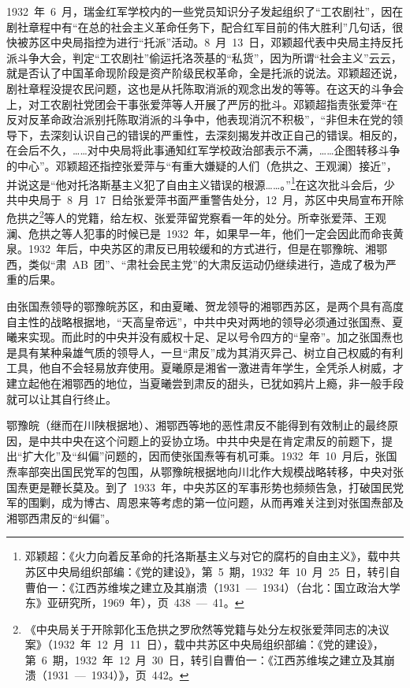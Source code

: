 1932~年~6~月，瑞金红军学校内的一些党员知识分子发起组织了“工农剧社”，因在剧社章程中有“在总的社会主义革命任务下，配合红军目前的伟大胜利”几句话，很快被苏区中央局指控为进行“托派”活动。8~月~13~日，邓颖超代表中央局主持反托派斗争大会，判定“工农剧社”偷运托洛茨基的“私货”，因为所谓“社会主义”云云，就是否认了中国革命现阶段是资产阶级民权革命，全是托派的说法。邓颖超还说，剧社章程没提农民问题，这也是从托陈取消派的观念出发的等等。在这天的斗争会上，对工农剧社党团会干事张爱萍等人开展了严厉的批斗。邓颖超指责张爱萍“在反对反革命政治派别托陈取消派的斗争中，他表现消沉不积极”，“非但未在党的领导下，去深刻认识自己的错误的严重性，去深刻揭发并改正自己的错误。相反的，在会后不久，……对中央局将此事通知红军学校政治部表示不满，……企图转移斗争的中心”。邓颖超还指控张爱萍与“有重大嫌疑的人们（危拱之、王观澜）接近”，并说这是“他对托洛斯基主义犯了自由主义错误的根源……。”\footnote{邓颖超：《火力向着反革命的托洛斯基主义与对它的腐朽的自由主义》，载中共苏区中央局组织部编：《党的建设》，第~5~期，1932~年~10~月~25~日，转引自曹伯一：《江西苏维埃之建立及其崩溃（1931~—~1934）（台北：国立政治大学东》亚研究所，1969~年），页~438~—~41。}在这次批斗会后，少共中央局于~8~月~17~日给张爱萍书面严重警告处分，12~月，苏区中央局宣布开除危拱之\footnote{《中央局关于开除郭化玉危拱之罗欣然等党籍与处分左权张爱萍同志的决议案》（1932~年~12~月~11~日），载中共苏区中央局组织部编：《党的建设》，第~6~期，1932~年~12~月~30~日，转引自曹伯一：《江西苏维埃之建立及其崩溃（1931~—~1934）》，页~442。}等人的党籍，给左权、张爱萍留党察看一年的处分。所幸张爱萍、王观澜、危拱之等人犯事的时候已是~1932~年，如果早一年，他们一定会因此而命丧黄泉。1932~年后，中央苏区的肃反已用较缓和的方式进行，但是在鄂豫皖、湘鄂西，类似“肃~AB~团”、“肃社会民主党”的大肃反运动仍继续进行，造成了极为严重的后果。

由张国焘领导的鄂豫皖苏区，和由夏曦、贺龙领导的湘鄂西苏区，是两个具有高度自主性的战略根据地，“天高皇帝远”，中共中央对两地的领导必须通过张国焘、夏曦来实现。而此时的中央并没有威权十足、足以号令四方的“皇帝”。加之张国焘也是具有某种枭雄气质的领导人，一旦“肃反”成为其消灭异己、树立自己权威的有利工具，他自不会轻易放弃使用。夏曦原是湘省一激进青年学生，全凭杀人树威，才建立起他在湘鄂西的地位，当夏曦尝到肃反的甜头，已犹如鸦片上瘾，非一般手段就可以让其自行终止。

鄂豫皖（继而在川陕根据地）、湘鄂西等地的恶性肃反不能得到有效制止的最终原因，是中共中央在这个问题上的妥协立场。中共中央是在肯定肃反的前题下，提出“扩大化”及“纠偏”问题的，因而使张国焘等有机可乘。1932~年~10~月后，张国焘率部突出国民党军的包围，从鄂豫皖根据地向川北作大规模战略转移，中央对张国焘更是鞭长莫及。到了~1933~年，中央苏区的军事形势也频频告急，打破国民党军的围剿，成为博古、周恩来等考虑的第一位问题，从而再难关注到对张国焘部及湘鄂西肃反的“纠偏”。


